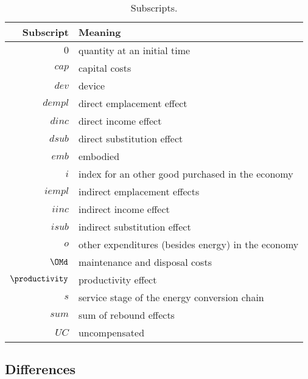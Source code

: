 
\begin{table}
\centering
\caption{Subscripts.}
\begin{tabular}{r l}
  \toprule
  Subscript & Meaning \\
  \midrule
  $0$ & quantity at an initial time \\
  $cap$ & capital costs \\
  $dev$ & device \\
  $dempl$ & direct emplacement effect \\
  $dinc$ & direct income effect \\
  $dsub$ & direct substitution effect \\
  $emb$ & embodied \\
  $i$ & index for an other good purchased in the economy \\
  $iempl$ & indirect emplacement effects \\
  $iinc$ & indirect income effect \\
  $isub$ & indirect substitution effect \\
  $o$ & other expenditures (besides energy) in the economy \\
  $\OMd$ & maintenance and disposal costs \\
  $\productivity$ & productivity effect \\
  $s$ & service stage of the energy conversion chain \\
  $sum$ & sum of rebound effects \\
  $UC$ & uncompensated \\
  \bottomrule
\end{tabular}
\label{tab:subscripts}
\end{table}


\subsection{Differences}
\label{sec:differences}

